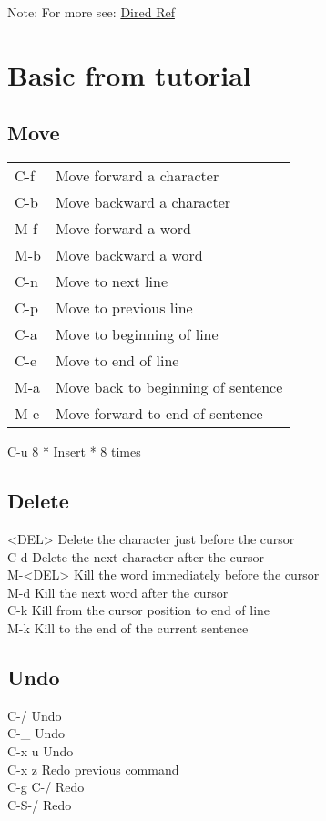 \documentclass[11pt]{article}
\begin{document}
Note: For more see: \href{dired-ref.pdf}{Dired Ref}\\

\section{Basic from tutorial}
\label{sec:orge5113bf}
\subsection{Move}
\label{sec:org49309ec}
\begin{center}
\begin{tabular}{ll}
\hline
C-f & Move forward a character\\
C-b & Move backward a character\\
M-f & Move forward a word\\
M-b & Move backward a word\\
C-n & Move to next line\\
C-p & Move to previous line\\
C-a & Move to beginning of line\\
C-e & Move to end of line\\
M-a & Move back to beginning of sentence\\
M-e & Move forward to end of sentence\\
\end{tabular}
\end{center}

C-u 8 *  Insert * 8 times\\
\subsection{Delete}
\label{sec:org8b7b97a}
<DEL>        Delete the character just before the cursor\\
C-d   	     Delete the next character after the cursor\\

M-<DEL>      Kill the word immediately before the cursor\\
M-d	     Kill the next word after the cursor\\

C-k	     Kill from the cursor position to end of line\\
M-k	     Kill to the end of the current sentence\\
\subsection{Undo}
\label{sec:orgb63514d}
C-/          Undo\\
C-\_          Undo\\
C-x u        Undo\\
C-x z        Redo previous command\\
C-g C-/      Redo\\
C-S-/        Redo\\
\end{document}
